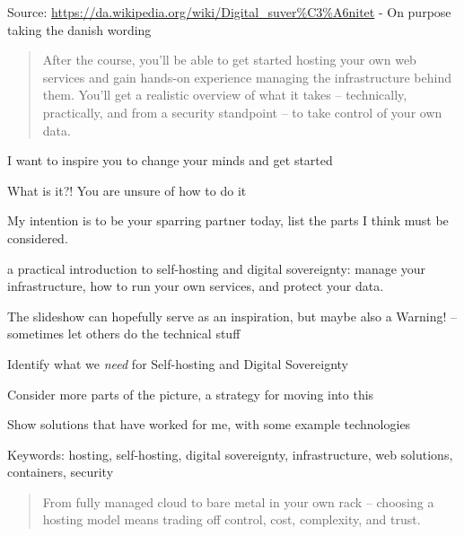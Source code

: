 \documentclass[Screen16to9,17pt]{foils}
\begin{document}
Source: \url{https://da.wikipedia.org/wiki/Digital_suver%C3%A6nitet} - On purpose taking the danish wording



\begin{quote}
After the course, you'll be able to get started hosting your own web services and gain hands-on experience managing the infrastructure behind them. You'll get a realistic overview of what it takes -- technically, practically, and from a security standpoint -- to take control of your own data.
\end{quote}

I want to inspire you to change your minds and get started
\begin{list2}
\item What is it?! You are unsure of how to do it
\item My intention is to be your sparring partner today, list the parts I think must be considered.
\item a practical introduction to self-hosting and digital sovereignty:
 manage your infrastructure,
 how to run your own services,
 and protect your data.

\item The slideshow can hopefully serve as an inspiration, but maybe also a Warning! -- sometimes let others do the technical stuff \smiley
\end{list2}





\begin{list2}
\item Identify what we \emph{need} for Self-hosting and Digital Sovereignty
\item Consider more parts of the picture, a strategy for moving into this
\item Show solutions that have worked for me, with some example technologies
\end{list2}

Keywords: hosting, self-hosting, digital sovereignty, infrastructure, web solutions, containers, security




\begin{quote}
From fully managed cloud to bare metal in your own rack --
choosing a hosting model means trading off control, cost, complexity, and trust.
\end{quote}
\end{document}
